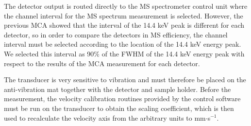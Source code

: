 \par
The detector output is routed directly to the MS spectrometer control unit where the channel interval for the MS spectrum measurement is selected. However, the previous MCA showed that the interval of the 14.4 keV peak is different for each detector, so in order to compare the detectors in MS efficiency, the channel interval must be selected according to the location of the 14.4 keV energy peak. We selected this interval as 90$\%$ of the FWHM of the 14.4 keV energy peak with respect to the results of the MCA measurement for each detector.
%
\par
The transducer is very sensitive to vibration and must therefore be placed on the anti-vibration mat together with the detector and sample holder. Before the measurement, the velocity calibration routines provided by the control software must be run on the transducer to obtain the scaling coefficient, which is then used to recalculate the velocity axis from the arbitrary units to mm$\cdot$s$^{-1}$. 

